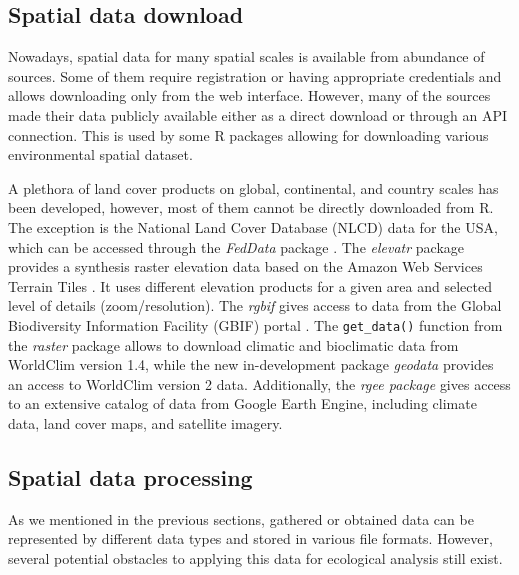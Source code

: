 \documentclass[smallextended]{svjour3}       %
\begin{document}
\hypertarget{spatial-data-download}{%
\subsection{Spatial data download}\label{spatial-data-download}}

Nowadays, spatial data for many spatial scales is available from abundance of sources.
Some of them require registration or having appropriate credentials and allows downloading only from the web interface.
However, many of the sources made their data publicly available either as a direct download or through an API connection.
This is used by some R packages allowing for downloading various environmental spatial dataset.

A plethora of land cover products on global, continental, and country scales has been developed, however, most of them cannot be directly downloaded from R.
The exception is the National Land Cover Database (NLCD) data for the USA, which can be accessed through the \emph{FedData} package \cite{R-FedData}.
The \emph{elevatr} package provides a synthesis raster elevation data based on the Amazon Web Services Terrain Tiles \cite{R-elevatr}.
It uses different elevation products for a given area and selected level of details (zoom/resolution).
The \emph{rgbif} gives access to data from the Global Biodiversity Information Facility (GBIF) portal \cite{R-rgbif}.
The \texttt{get\_data()} function from the \emph{raster} package allows to download climatic and bioclimatic data from WorldClim version 1.4, while the new in-development package \emph{geodata} provides an access to WorldClim version 2 data.
Additionally, the \emph{rgee package} \cite{R-rgee} gives access to an extensive catalog of data from Google Earth Engine, including climate data, land cover maps, and satellite imagery.

\hypertarget{spatial-data-processing}{%
\subsection{Spatial data processing}\label{spatial-data-processing}}

As we mentioned in the previous sections, gathered or obtained data can be represented by different data types and stored in various file formats.
However, several potential obstacles to applying this data for ecological analysis still exist.
\end{document}
